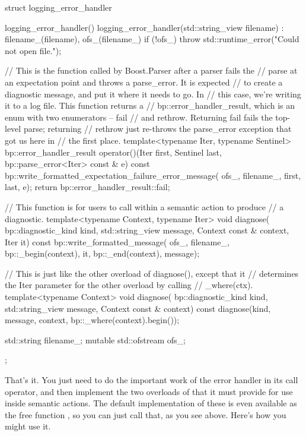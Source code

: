 \documentclass{MyBook}
\begin{document}
\begin{code}
struct logging_error_handler
{
    logging_error_handler() {}
    logging_error_handler(std::string_view filename) :
        filename_(filename), ofs_(filename_)
    {
        if (!ofs_)
            throw std::runtime_error("Could not open file.");
    }

    // This is the function called by Boost.Parser after a parser fails the
    // parse at an expectation point and throws a parse_error.  It is expected
    // to create a diagnostic message, and put it where it needs to go.  In
    // this case, we're writing it to a log file.  This function returns a
    // bp::error_handler_result, which is an enum with two enumerators -- fail
    // and rethrow.  Returning fail fails the top-level parse; returning
    // rethrow just re-throws the parse_error exception that got us here in
    // the first place.
    template<typename Iter, typename Sentinel>
    bp::error_handler_result
    operator()(Iter first, Sentinel last, bp::parse_error<Iter> const & e) const
    {
        bp::write_formatted_expectation_failure_error_message(
            ofs_, filename_, first, last, e);
        return bp::error_handler_result::fail;
    }

    // This function is for users to call within a semantic action to produce
    // a diagnostic.
    template<typename Context, typename Iter>
    void diagnose(
        bp::diagnostic_kind kind,
        std::string_view message,
        Context const & context,
        Iter it) const
    {
        bp::write_formatted_message(
            ofs_,
            filename_,
            bp::_begin(context),
            it,
            bp::_end(context),
            message);
    }

    // This is just like the other overload of diagnose(), except that it
    // determines the Iter parameter for the other overload by calling
    // _where(ctx).
    template<typename Context>
    void diagnose(
        bp::diagnostic_kind kind,
        std::string_view message,
        Context const & context) const
    {
        diagnose(kind, message, context, bp::_where(context).begin());
    }

    std::string filename_;
    mutable std::ofstream ofs_;
};
\end{code}

That's it. You just need to do the important work of the error handler in its call operator, and then implement the two overloads of  that it must provide for use inside semantic actions. The default implementation of these is even available as the free function , so you can just call that, as you see above. Here's how you might use it.
\end{document}
